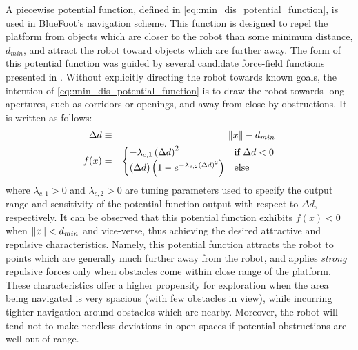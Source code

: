 			A piecewise potential function, defined in \ref{eq::min_dis_potential_function}, is used in BlueFoot's navigation scheme. This function is designed to repel the platform from objects which are closer to the robot than some minimum distance, $d_{min}$, and attract the robot toward objects which are further away. The form of this potential function was guided by several candidate force-field functions presented in \cite{ArambulaCosio2004}. Without explicitly directing the robot towards known goals, the intention of \ref{eq::min_dis_potential_function} is to draw the robot towards long apertures, such as corridors or openings, and away from close-by obstructions. It is written as follows:
				\begin{eqnarray}
					\Delta d &\equiv& \left\lVert x\right\rVert-d_{min} \nonumber \\
					f(x) &=& 
					\begin{cases}	
					 	 -\lambda_{c,1} \left(\Delta d\right)^{2} &  \text{if } \Delta d < 0 \\
						\left(\Delta d\right) \left( 1  - e^{ -  \lambda_{c,2} { \left(\Delta d\right) }^{2} } \right) 	&  \text{else}
					\end{cases}
				\label{eq::min_dis_potential_function}
				\end{eqnarray}
			where $\lambda_{c,1}>0$ and $\lambda_{c,2}>0$ are tuning parameters used to specify the output range and sensitivity of the potential function output with respect to $\Delta d$, respectively. It can be observed that this potential function exhibits $f(x)<0$ when $\left\lVert x\right\rVert < d_{min}$ and vice-verse, thus achieving the desired attractive and repulsive characteristics. Namely, this potential function attracts the robot to points which are generally much further away from the robot, and applies \emph{strong} repulsive forces only when obstacles come within close range of the platform. These characteristics offer a higher propensity for exploration when the area being navigated is very spacious (with few obstacles in view), while incurring tighter navigation around obstacles which are nearby. Moreover, the robot will tend not to make needless deviations in open spaces if potential obstructions are well out of range.

